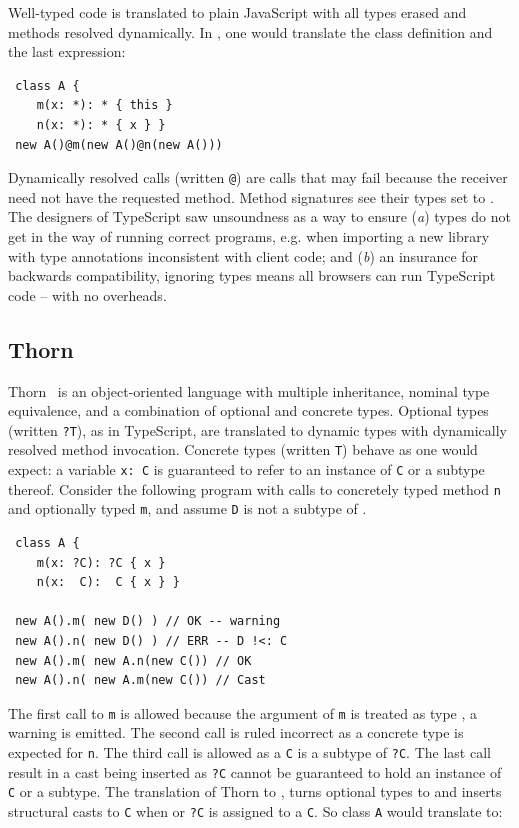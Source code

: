 \documentclass[a4paper,USenglish]{tex/lipics-v2016}
\newcommand{\code}[1]{{\tt #1}\xspace}
\begin{document}
\noindent
Well-typed code is translated to plain JavaScript with all types erased and
methods resolved dynamically. In \kafka, one would translate the class
definition and the last expression:

\begin{lstlisting}
 class A { 
    m(x: *): * { this }
    n(x: *): * { x } }
 new A()@m(new A()@n(new A()))    
\end{lstlisting}

\noindent
Dynamically resolved calls (written \code @) are calls that may fail because
the receiver need not have the requested method. Method signatures see their
types set to \any.  The designers of TypeScript saw unsoundness as a way to
ensure ({\em a}) types do not get in the way of running correct programs,
e.g. when importing a new library with type annotations inconsistent with
client code; and ({\em b}) an insurance for backwards compatibility,
ignoring types means all browsers can run TypeScript code -- with no
overheads.

\subsection{Thorn}

Thorn~\cite{oopsla09} is an object-oriented language with multiple
inheritance, nominal type equivalence, and a combination of optional and
concrete types. Optional types (written \code{?T}), as in TypeScript, are
translated to dynamic types with dynamically resolved method
invocation. Concrete types (written \code{T}) behave as one would expect: a
variable \code{x:~C} is guaranteed to refer to an instance of \code C or a
subtype thereof. Consider the following program with calls to concretely
typed method \code n and optionally typed \code m, and assume \code D is not
a subtype of \C.

\begin{lstlisting}
 class A {
    m(x: ?C): ?C { x }
    n(x:  C):  C { x } }

 new A().m( new D() ) // OK -- warning
 new A().n( new D() ) // ERR -- D !<: C
 new A().m( new A.n(new C()) // OK
 new A().n( new A.m(new C()) // Cast
\end{lstlisting}

\noindent
The first call to \code m is allowed because the argument of \code m is
treated as type \any, a warning is emitted. The second call is ruled
incorrect as a concrete type is expected for \code n. The third call is
allowed as a \code C is a subtype of \code{?C}. The last call result in a
cast being inserted as \code{?C} cannot be guaranteed to hold an instance of
\code{C} or a subtype.  The translation of Thorn to \kafka, turns optional
types to \any and inserts structural casts to \code{C} when \any or
\code{?C} is assigned to a \code{C}. So class \code A would translate to:
\end{document}
